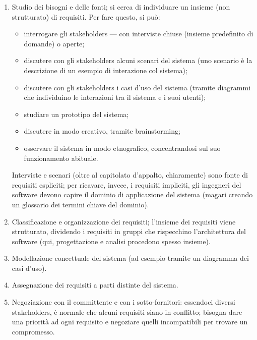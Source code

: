 \documentclass[a4paper]{article}
\begin{document}
	\begin{enumerate}
		
			
	\item Studio dei bisogni e delle fonti; si cerca di individuare un insieme (non strutturato) di requisiti. Per fare questo, si può:
				
	\begin{itemize}
		
					
	\item interrogare gli stakeholders — con interviste chiuse (insieme predefinito di domande) o aperte;
					
	\item discutere con gli stakeholders alcuni scenari del sistema (uno scenario è la descrizione di un esempio di interazione col sistema);
					
	\item discutere con gli stakeholders i casi d'uso del sistema (tramite diagrammi che individuino le interazioni tra il sistema e i suoi utenti);
					
	\item studiare un prototipo del sistema;
					
	\item discutere in modo creativo, tramite brainstorming;
					
	\item osservare il sistema in modo etnografico, concentrandosi sul suo funzionamento abituale.
				
	\end{itemize}

			Interviste e scenari (oltre al capitolato d'appalto, chiaramente) sono fonte di requisiti espliciti; per ricavare, invece, i requisiti impliciti, gli ingegneri del software devono capire il dominio di applicazione del sistema (magari creando un glossario dei termini chiave del dominio).
			
			
	\item Classificazione e organizzazione dei requisiti; l'insieme dei requisiti viene strutturato, dividendo i requisiti in gruppi che rispecchino l'architettura del software (qui, progettazione e analisi procedono spesso insieme).
			
	\item Modellazione concettuale del sistema (ad esempio tramite un diagramma dei casi d'uso).
			
	\item Assegnazione dei requisiti a parti distinte del sistema.
			
	\item Negoziazione con il committente e con i sotto-fornitori: essendoci diversi stakeholders, è normale che alcuni requisiti siano in conflitto; bisogna dare una priorità ad ogni requisito e negoziare quelli incompatibili per trovare un compromesso.
		
	\end{enumerate}
\end{document}
